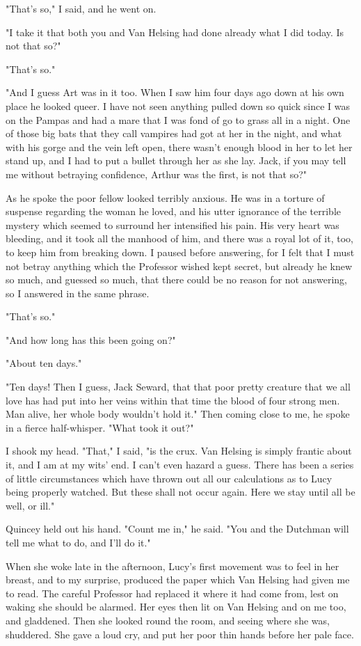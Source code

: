 "That's so," I said, and he went on. 

"I take it that both you and Van Helsing had done already what I did today. Is not that so?" 

"That's so." 

"And I guess Art was in it too. When I saw him four days ago down at his own place he looked queer. I have not seen anything pulled down so quick since I was on the Pampas and had a mare that I was fond of go to grass all in a night. One of those big bats that they call vampires had got at her in the night, and what with his gorge and the vein left open, there wasn't enough blood in her to let her stand up, and I had to put a bullet through her as she lay. Jack, if you may tell me without betraying confidence, Arthur was the first, is not that so?" 

As he spoke the poor fellow looked terribly anxious. He was in a torture of suspense regarding the woman he loved, and his utter ignorance of the terrible mystery which seemed to surround her intensified his pain. His very heart was bleeding, and it took all the manhood of him, and there was a royal lot of it, too, to keep him from breaking down. I paused before answering, for I felt that I must not betray anything which the Professor wished kept secret, but already he knew so much, and guessed so much, that there could be no reason for not answering, so I answered in the same phrase. 

"That's so." 

"And how long has this been going on?" 

"About ten days." 

"Ten days! Then I guess, Jack Seward, that that poor pretty creature that we all love has had put into her veins within that time the blood of four strong men. Man alive, her whole body wouldn't hold it." Then coming close to me, he spoke in a fierce half-whisper. "What took it out?" 

I shook my head. "That," I said, "is the crux. Van Helsing is simply frantic about it, and I am at my wits' end. I can't even hazard a guess. There has been a series of little circumstances which have thrown out all our calculations as to Lucy being properly watched. But these shall not occur again. Here we stay until all be well, or ill." 

Quincey held out his hand. "Count me in," he said. "You and the Dutchman will tell me what to do, and I'll do it." 

When she woke late in the afternoon, Lucy's first movement was to feel in her breast, and to my surprise, produced the paper which Van Helsing had given me to read. The careful Professor had replaced it where it had come from, lest on waking she should be alarmed. Her eyes then lit on Van Helsing and on me too, and gladdened. Then she looked round the room, and seeing where she was, shuddered. She gave a loud cry, and put her poor thin hands before her pale face. 

